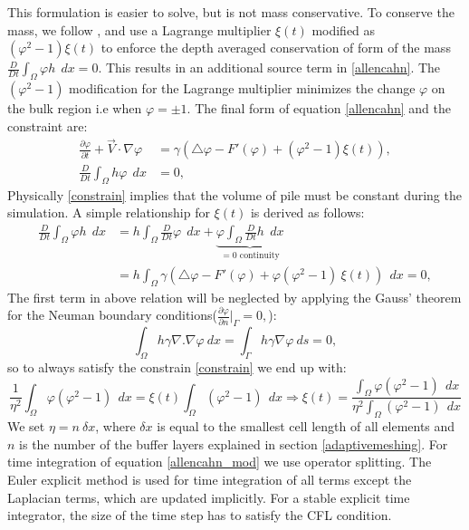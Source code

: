 \documentclass[review]{elsarticle}
\begin{document}
This formulation is easier to solve, but is not mass conservative. To conserve the mass, we follow \cite{Kim2014,Yang2006}, and use a Lagrange multiplier $\xi(t)$ modified as $(\varphi^2-1)\xi(t)$ to enforce the depth
averaged conservation of form of the mass $ \frac{D}{Dt} \int_\Omega \varphi h \ \ dx= 0$. This results in an additional source term in  \eqref{allencahn}.
 The $(\varphi^2-1)$ modification  for the Lagrange multiplier minimizes the  change $\varphi$ on the bulk region  i.e when $\varphi=\pm1$. 
 The final form of equation \eqref{allencahn} and the constraint are:  
\begin{align} 
        \label{allencahn_mod}
        \frac{\partial \varphi }{\partial t} + \overrightarrow{V}\cdot \nabla \varphi &= 
        \gamma (\bigtriangleup\varphi -F'(\varphi)+ (\varphi^2-1)\xi(t)), \\
        \label{constrain}
        \frac{D}{Dt} \int_\Omega h \varphi \ \ dx&= 0,
\end{align}
Physically \eqref{constrain} implies that the volume of pile must be constant during the simulation. A simple relationship for  $\xi(t)$ is derived as follows:
\begin{equation} 
    \begin{aligned}
        \label{eta}
        \frac{D}{Dt} \int_\Omega \varphi h \ \ dx &= h \int_\Omega \frac{D}{Dt}  \varphi  \ \ dx+\underbrace{\varphi \int_\Omega  \frac{D}{Dt} h  \ \ dx}_{=0 \text{\ \ continuity}} \\ &=h\int_\Omega \gamma (\bigtriangleup\varphi -F'(\varphi)+\varphi (\varphi^2-1)\ \xi(t)) \ \ dx=0,
            \end{aligned}
\end{equation}
The first term in above relation will be neglected by applying the Gauss' theorem for the Neuman boundary conditions($
        \frac{\partial \varphi}{\partial n}\vert_{\Gamma} = 0,
$):
\begin{equation}
        \label{lapbound}
        \int_\Omega h \gamma  \nabla. \nabla \varphi \ dx = 
        \int_\Gamma h \gamma \nabla \varphi \ ds = 0,
\end{equation}
so to always satisfy the constrain \eqref{constrain} we end up with:
\begin{equation} 
        \label{eta_cont}
\frac{1}{\eta^2} \int_\Omega  \varphi (\varphi^2 -1) \ \ dx = \xi(t) \int_\Omega (\varphi^2-1)  \ \ dx \Rightarrow \xi(t) = \frac{\int_\Omega  \varphi (\varphi^2 -1) \ \ dx}{\eta^2 \int_\Omega (\varphi^2-1)  \ \ dx }
\end{equation}
We set $\eta=n\  \delta x$, where $\delta x$ is equal to the smallest cell length of all elements and $n$ is the number of the buffer layers explained in section \ref{adaptivemeshing}.
For time integration of equation \eqref{allencahn_mod} we use operator splitting. The Euler explicit method is used for time integration of all terms except the Laplacian terms, 
which are updated implicitly. For a stable explicit time integrator, the size of the time step has to satisfy the CFL condition.
\end{document}
